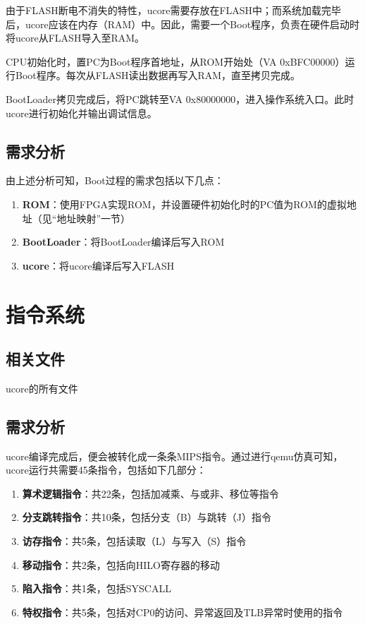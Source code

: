 由于FLASH断电不消失的特性，ucore需要存放在FLASH中；而系统加载完毕后，ucore应该在内存（RAM）中。因此，需要一个Boot程序，负责在硬件启动时将ucore从FLASH导入至RAM。

CPU初始化时，置PC为Boot程序首地址，从ROM开始处（VA 0xBFC00000）运行Boot程序。每次从FLASH读出数据再写入RAM，直至拷贝完成。

BootLoader拷贝完成后，将PC跳转至VA 0x80000000，进入操作系统入口。此时ucore进行初始化并输出调试信息。

\subsection{需求分析}

由上述分析可知，Boot过程的需求包括以下几点：

\begin{enumerate}
    \item {\bf ROM}：使用FPGA实现ROM，并设置硬件初始化时的PC值为ROM的虚拟地址（见``地址映射''一节）
    \item {\bf BootLoader}：将BootLoader编译后写入ROM
    \item {\bf ucore}：将ucore编译后写入FLASH
\end{enumerate}

\section{指令系统}

\subsection{相关文件}

ucore的所有文件

\subsection{需求分析}

ucore编译完成后，便会被转化成一条条MIPS指令。通过进行qemu仿真可知，ucore运行共需要45条指令，包括如下几部分：

\begin{enumerate}
    \item {\bf 算术逻辑指令}：共22条，包括加减乘、与或非、移位等指令
    \item {\bf 分支跳转指令}：共10条，包括分支（B）与跳转（J）指令
    \item {\bf 访存指令}：共5条，包括读取（L）与写入（S）指令
    \item {\bf 移动指令}：共2条，包括向HILO寄存器的移动
    \item {\bf 陷入指令}：共1条，包括SYSCALL
    \item {\bf 特权指令}：共5条，包括对CP0的访问、异常返回及TLB异常时使用的指令
\end{enumerate}

